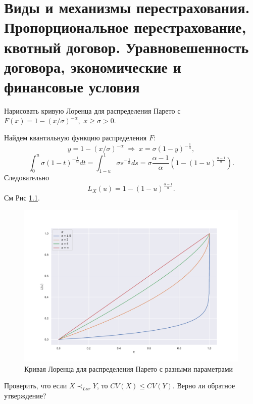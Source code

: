 \chapter{Виды и механизмы перестрахования. Пропорциональное перестрахование, квотный договор. Уравновешенность договора, экономические и финансовые условия}
\problem{}
Нарисовать кривую Лоренца для распределения Парето с $F(x) = 1 - (x/\sigma)^{-\alpha},$ $x \geq \sigma > 0$.
\solution{}

    Найдем квантильную функцию распределения $F$:
    \begin{equation*}
        y = 1 - (x/\sigma)^{-\alpha}  \; \Rightarrow \; x = \sigma(1 - y)^{-\frac{1}{\alpha}},
    \end{equation*}
    \begin{equation*}
        \int_0^u \sigma(1-t)^{-\frac{1}{\alpha}}dt = \int_{1-u}^1 \sigma s^{-\frac{1}{\alpha}}ds = \sigma \frac{\alpha - 1}{\alpha}\left(1 - (1 - u)^{\frac{\alpha - 1 }{\alpha}}\right).
    \end{equation*}
    Следовательно 
    \begin{equation*}
        L_X(u) = 1 - (1 - u)^{\frac{\alpha- 1}{\alpha}}.
    \end{equation*}
    См Рис \ref{fig:hw8t1p1}.

    \begin{figure}[htbp]
        \centering
        \includegraphics[width=\linewidth]{pics/hw8t1p1.pdf}
        \caption{Кривая Лоренца для распределения Парето с разными параметрами}
        \label{fig:hw8t1p1}
    \end{figure}

\problem{}
Проверить, что если $X \prec_{Lor} Y$, то $CV(X) \leq CV(Y)$. Верно ли обратное утверждение?
\solution{}

